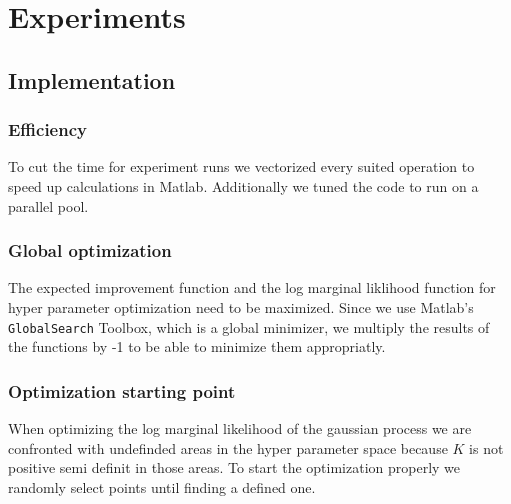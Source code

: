 \chapter{Experiments}
\label{chap:4}


\section{Implementation}

\subsection{Efficiency}
To cut the time for experiment runs we vectorized every suited operation to speed up calculations in Matlab. Additionally we tuned the code to run on a parallel pool.\\

\subsection{Global optimization}
The expected improvement function and the log marginal liklihood function for hyper parameter optimization need to be maximized. Since we use Matlab's \texttt{GlobalSearch} Toolbox, which is a global minimizer, we multiply the results of the functions by -1 to be able to minimize them appropriatly.
\\

\subsection{Optimization starting point}
When optimizing the log marginal likelihood of the gaussian process we are confronted with undefinded areas in the hyper parameter space because $K$ is not positive semi definit in those areas. To start the optimization properly we randomly select points until finding a defined one.

